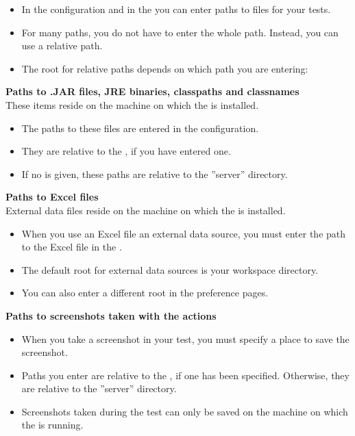\begin{itemize}
\item In the \gdaut{} configuration and in the \gdpropview{} you can enter paths to files for your tests. 
\item For many paths, you do not have to enter the whole path. Instead, you can use a relative path.
\item The root for relative paths depends on which path you are entering:
\end{itemize}

\textbf{Paths to .JAR files, JRE binaries, classpaths and classnames}\\
These items reside on the machine on which the \gdagent is installed. 
\begin{itemize}
\item The paths to these files are entered in the \gdaut{} configuration. 
\item They are relative to the \gdaut{} , if you have entered one. 
\item If no \gdaut{}  is given, these paths are relative to the ''server'' directory. 
\end{itemize}


\textbf{Paths to Excel files}\\
External data files reside on the machine on which the \ite{} is installed. 
\begin{itemize}
\item When you use an Excel file  an external data source, you  must enter the path to the Excel file in the \gdpropview{}.  
\item The default root for external data sources is your workspace directory.
\item You can also enter a different root in the preference pages. 
\end{itemize}

\textbf{Paths to screenshots taken with the  actions}\\
\begin{itemize}
\item When you take a screenshot in your test, you must specify a place to save the screenshot. 
\item Paths you enter are relative to the \gdaut{} , if one has been specified. Otherwise, they are relative to the ''server'' directory.
\item Screenshots taken during the test can only be saved on the machine on which the \gdagent{} is running. 
\end{itemize}

